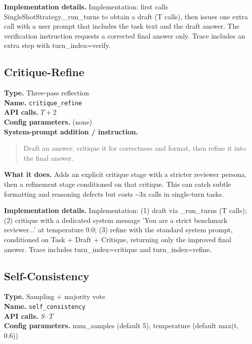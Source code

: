 \documentclass[10pt,twocolumn]{article}
\begin{document}
\noindent\textbf{Implementation details.} Implementation: first calls SingleShotStrategy.\_run\_turns to obtain a draft (T calls), then issues one extra call with a user prompt that includes the task text and the draft answer. The verification instruction requests a corrected final answer only. Trace includes an extra step with turn\_index=verify.

\subsection*{Critique-Refine}
\noindent\textbf{Type.} Three-pass reflection\\
\textbf{Name.} \texttt{critique\_\hspace{0pt}refine}\\
\textbf{API calls.} $T + 2$\\
\textbf{Config parameters.} (none)\\

\noindent\textbf{System-prompt addition / instruction.}
\begin{quote}\footnotesize
Draft an answer, critique it for correctness and format, then refine it into the final answer.
\end{quote}
\noindent\textbf{What it does.} Adds an explicit critique stage with a stricter reviewer persona, then a refinement stage conditioned on that critique. This can catch subtle formatting and reasoning defects but costs \textasciitilde{}3x calls in single-turn tasks.

\noindent\textbf{Implementation details.} Implementation: (1) draft via \_run\_turns (T calls); (2) critique with a dedicated system message 'You are a strict benchmark reviewer...' at temperature 0.0; (3) refine with the standard system prompt, conditioned on Task + Draft + Critique, returning only the improved final answer. Trace includes turn\_index=critique and turn\_index=refine.

\subsection*{Self-Consistency}
\noindent\textbf{Type.} Sampling + majority vote\\
\textbf{Name.} \texttt{self\_\hspace{0pt}consistency}\\
\textbf{API calls.} $S \cdot T$\\
\textbf{Config parameters.} num\_samples (default 5), temperature (default max(t, 0.6))\\
\end{document}
